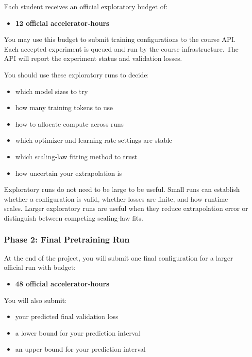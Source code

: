 \documentclass[
  11pt,
]{article}
\providecommand{\tightlist}{%
  \setlength{\itemsep}{0pt}\setlength{\parskip}{0pt}}
\begin{document}
Each student receives an official exploratory budget of:

\begin{itemize}
\tightlist
\item
  \textbf{12 official accelerator-hours}
\end{itemize}

You may use this budget to submit training configurations to the course
API. Each accepted experiment is queued and run by the course
infrastructure. The API will report the experiment status and validation
losses.

You should use these exploratory runs to decide:

\begin{itemize}
\tightlist
\item
  which model sizes to try
\item
  how many training tokens to use
\item
  how to allocate compute across runs
\item
  which optimizer and learning-rate settings are stable
\item
  which scaling-law fitting method to trust
\item
  how uncertain your extrapolation is
\end{itemize}

Exploratory runs do not need to be large to be useful. Small runs can
establish whether a configuration is valid, whether losses are finite,
and how runtime scales. Larger exploratory runs are useful when they
reduce extrapolation error or distinguish between competing scaling-law
fits.

\hypertarget{phase-2-final-pretraining-run}{%
\subsubsection{Phase 2: Final Pretraining
Run}\label{phase-2-final-pretraining-run}}

At the end of the project, you will submit one final configuration for a
larger official run with budget:

\begin{itemize}
\tightlist
\item
  \textbf{48 official accelerator-hours}
\end{itemize}

You will also submit:

\begin{itemize}
\tightlist
\item
  your predicted final validation loss
\item
  a lower bound for your prediction interval
\item
  an upper bound for your prediction interval
\end{itemize}
\end{document}
